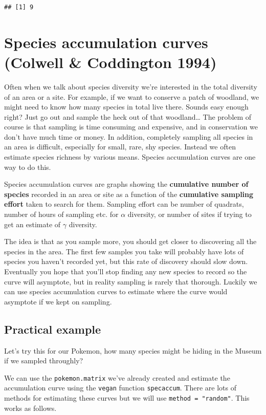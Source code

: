 \documentclass[]{book}
\theoremstyle{definition}
\theoremstyle{definition}
\theoremstyle{definition}
\theoremstyle{remark}
\begin{document}
\begin{verbatim}
## [1] 9
\end{verbatim}

\section{Species accumulation curves (Colwell \& Coddington
1994)}\label{species-accumulation-curves-colwell-coddington-1994}

Often when we talk about species diversity we're interested in the total
diversity of an area or a site. For example, if we want to conserve a
patch of woodland, we might need to know how many species in total live
there. Sounds easy enough right? Just go out and sample the heck out of
that woodland\ldots{} The problem of course is that sampling is time
consuming and expensive, and in conservation we don't have much time or
money. In addition, completely sampling all species in an area is
difficult, especially for small, rare, shy species. Instead we often
estimate species richness by various means. Species accumulation curves
are one way to do this.

Species accumulation curves are graphs showing the \textbf{cumulative
number of species} recorded in an area or site as a function of the
\textbf{cumulative sampling effort} taken to search for them. Sampling
effort can be number of quadrats, number of hours of sampling etc. for
\(\alpha\) diversity, or number of sites if trying to get an estimate of
\(\gamma\) diversity.

The idea is that as you sample more, you should get closer to
discovering all the species in the area. The first few samples you take
will probably have lots of species you haven't recorded yet, but this
rate of discovery should slow down. Eventually you hope that you'll stop
finding any new species to record so the curve will asymptote, but in
reality sampling is rarely that thorough. Luckily we can use species
accumulation curves to estimate where the curve would asymptote if we
kept on sampling.

\subsection{Practical example}\label{practical-example}

Let's try this for our Pokemon, how many species might be hiding in the
Museum if we sampled throughly?

We can use the \texttt{pokemon.matrix} we've already created and
estimate the accumulation curve using the \texttt{vegan} function
\texttt{specaccum}. There are lots of methods for estimating these
curves but we will use \texttt{method\ =\ "random"}. This works as
follows.
\end{document}
